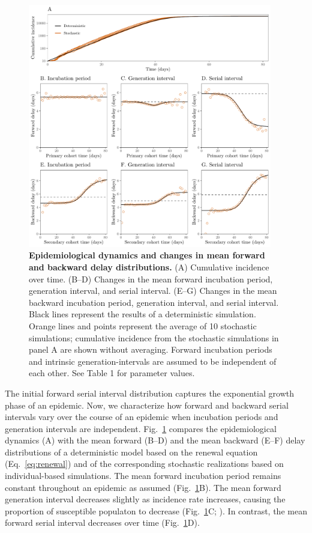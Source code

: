 \documentclass[12pt]{article}
\newcommand{\eref}[1]{Eq.~\ref{eq:#1}}
\newcommand{\fref}[1]{Fig.~\ref{fig:#1}}
\begin{document}
\begin{figure}[!ht]
\begin{center}
\includegraphics[width=0.95\textwidth]{forward.pdf}
\caption{
\textbf{Epidemiological dynamics and changes in mean forward and backward delay distributions.}
(A) Cumulative incidence over time.
(B--D) Changes in the mean forward incubation period, generation interval, and serial interval.
(E--G) Changes in the mean backward incubation period, generation interval, and serial interval.
Black lines represent the results of a deterministic simulation.
Orange lines and points represent the average of 10 stochastic simulations;
cumulative incidence from the stochastic simulations in panel A are shown without averaging.
Forward incubation periods and intrinsic generation-intervals are assumed to be independent of each other.
See Table 1 for parameter values.
}
\label{fig:epi}
\end{center}
\end{figure}

The initial forward serial interval distribution captures the exponential growth phase of an epidemic.
Now, we characterize how forward and backward serial intervals vary over the course of an epidemic when incubation periods and generation intervals are independent.
\fref{epi} compares the epidemiological dynamics (A) with the mean forward (B--D) and the mean backward (E--F) delay distributions of a deterministic model based on the renewal equation (\eref{renewal}) and of the corresponding stochastic realizations based on individual-based simulations.
The mean forward incubation period remains constant throughout an epidemic as assumed (\fref{epi}B).
The mean forward generation interval decreases slightly as incidence rate increases, causing the proportion of susceptible populaton to decrease (\fref{epi}C; \cite{kenah2008generation, champredon2015intrinsic}).
In contrast, the mean forward serial interval decreases over time (\fref{epi}D).
\end{document}
